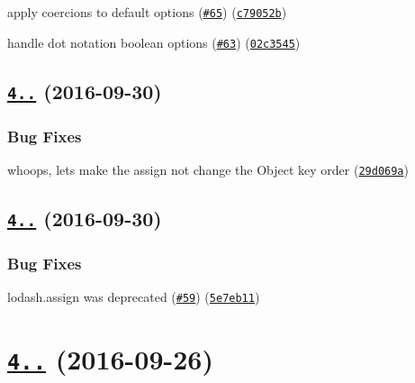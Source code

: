 \begin{DoxyItemize}
\item apply coercions to default options (\href{https://github.com/yargs/yargs-parser/issues/65}{\tt \#65}) (\href{https://github.com/yargs/yargs-parser/commit/c79052b}{\tt c79052b})
\item handle dot notation boolean options (\href{https://github.com/yargs/yargs-parser/issues/63}{\tt \#63}) (\href{https://github.com/yargs/yargs-parser/commit/02c3545}{\tt 02c3545})
\end{DoxyItemize}

\label{_4.0.2}%
 \subsection*{\href{https://github.com/yargs/yargs-parser/compare/v4.0.1...v4.0.2}{\tt 4..} (2016-\/09-\/30)}

\subsubsection*{Bug Fixes}


\begin{DoxyItemize}
\item whoops, let\textquotesingle{}s make the assign not change the Object key order (\href{https://github.com/yargs/yargs-parser/commit/29d069a}{\tt 29d069a})
\end{DoxyItemize}

\label{_4.0.1}%
 \subsection*{\href{https://github.com/yargs/yargs-parser/compare/v4.0.0...v4.0.1}{\tt 4..} (2016-\/09-\/30)}

\subsubsection*{Bug Fixes}


\begin{DoxyItemize}
\item lodash.\+assign was deprecated (\href{https://github.com/yargs/yargs-parser/issues/59}{\tt \#59}) (\href{https://github.com/yargs/yargs-parser/commit/5e7eb11}{\tt 5e7eb11})
\end{DoxyItemize}

\label{_4.0.0}%
 \section*{\href{https://github.com/yargs/yargs-parser/compare/v3.2.0...v4.0.0}{\tt 4..} (2016-\/09-\/26)}

